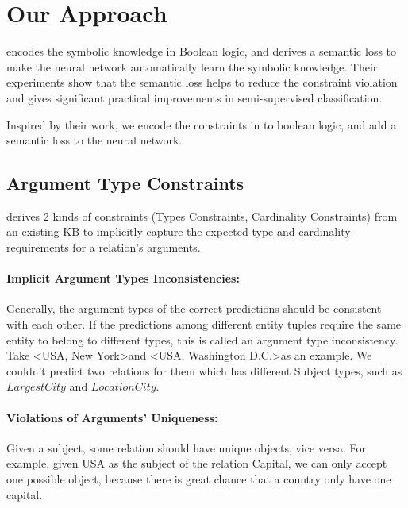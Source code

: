 \section{Our Approach}
\cite{xu2017semantic}  encodes the symbolic knowledge in Boolean logic, and derives a semantic loss to make the neural network automatically learn the symbolic knowledge. Their experiments show that the semantic loss helps to reduce the constraint violation and gives significant practical improvements in semi-supervised classification. 

Inspired by their work, we encode the constraints in \cite{chen2014encoding} to boolean logic, and add a semantic loss to the neural network.

\subsection{Argument Type Constraints}
\cite{chen2014encoding} derives 2 kinds of constraints (Types Constraints, Cardinality Constraints) from an existing KB to implicitly capture the expected type and cardinality requirements for a relation's arguments. 
\paragraph{Implicit Argument Types Inconsistencies:}
Generally, the argument types of the correct predictions should be consistent with each other. If the predictions among different entity tuples require the same entity to belong to different types, this is called an argument type inconsistency. Take \textless USA, New York\textgreater and \textless USA, Washington D.C.\textgreater as an example. We couldn't predict two relations for them which has different Subject types, such as $ LargestCity $ and $ LocationCity $.

\paragraph{Violations of Arguments' Uniqueness:}
Given a subject, some relation should have unique objects, vice versa. For example, given USA as the subject of the relation Capital, we can only accept one possible object, because there is great chance that a country only have one capital.

